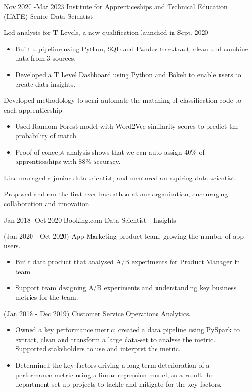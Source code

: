 \documentclass[10pt]{article} %
\begin{document}
\job
{Nov 2020 -}{Mar 2023}
{Institute for Apprenticeships and Technical Education (IfATE)}
{}
{Senior Data Scientist}
{
  \begin{itemize-noindent}
  \item{Led analysis for T Levels, a new qualification launched in Sept. 2020}
    \begin{itemize}
    \item{Built a pipeline using Python, SQL and Pandas to extract, clean and combine data from 3 sources.}
    \item{Developed a T Level Dashboard using Python and Bokeh to enable users to create data insights.}
    \end{itemize}
  \item{Developed methodology to semi-automate the matching of classification code to each apprenticeship.}
    \begin{itemize}
    \item{Used Random Forest model with Word2Vec similarity scores to predict the probability of match}
    \item{Proof-of-concept analysis shows that we can auto-assign 40\% of apprenticeships with 88\% accuracy.}
    \end{itemize}
  \item{Line managed a junior data scientist, and mentored an aspiring data scientist.}
  \item{Proposed and ran the first ever hackathon at our organisation, encouraging collaboration and innovation.}
  \end{itemize-noindent}
}

\job
{Jan 2018 -}{Oct 2020}
{Booking.com}
{}
{Data Scientist - Insights}
{
  \begin{itemize-noindent}
  \item{(Jan 2020 - Oct 2020) App Marketing product team, growing the number of app users.}
    \begin{itemize}
    \item{Built data product that analysed A/B experiments for Product Manager in team.}
    \item{Support team designing A/B experiments and understanding key business metrics for the team.}
    \end{itemize}
  \item{(Jan 2018 - Dec 2019) Customer Service Operations Analytics.}
    \begin{itemize}
    \item{
      Owned a key performance metric; created a data pipeline using PySpark
      to extract, clean and transform a large data-set to analyse the metric. Supported stakeholders to use and interpret the metric.}
    \item{Determined the key factors driving a long-term deterioration of a performance metric using a linear
          regression model, as a result the department set-up projects to tackle and mitigate for the key factors.}
    \end{itemize}
  \end{itemize-noindent}
}
\end{document}
